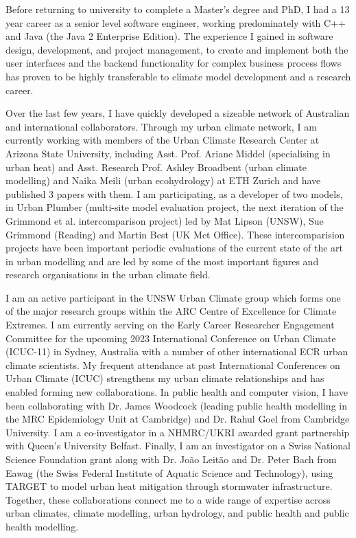 Before returning to university to complete a Master's degree and PhD, I had a 13 year career as a senior level software engineer, working predominately with C++ and Java (the Java 2 Enterprise Edition). The experience I gained in software design, development, and project management, to create and implement both the user interfaces and the backend functionality for complex business process flows has proven to be highly transferable to climate model development and a research career. 

Over the last few years, I have quickly developed a sizeable network of Australian and international collaborators. Through my urban climate network, I am currently working with members of the Urban Climate Research Center at Arizona State University, including Asst. Prof. Ariane Middel (specialising in urban heat) and Asst. Research Prof. Ashley Broadbent (urban climate modelling) and Naika Meili (urban ecohydrology) at ETH Zurich and have published 3 papers with them. I am participating, as a developer of two models, in Urban Plumber (multi-site model evaluation project, the next iteration of the Grimmond et al.\cite{Grimmond2011} intercomparison project) led by Mat Lipson (UNSW), Sue Grimmond (Reading) and Martin Best (UK Met Office). These intercomparision projects have been important periodic evaluations of the current state of the art in urban modelling and are led by some of the most important figures and research organisations in the urban climate field. 

I am an active participant in the UNSW Urban Climate group which forms one of the major research groups within the ARC Centre of Excellence for Climate Extremes. I am currently serving on the Early Career Researcher Engagement Committee for the upcoming 2023 International Conference on Urban Climate (ICUC-11) in Sydney, Australia with a number of other international ECR urban climate scientists. My frequent attendance at past International Conferences on Urban Climate (ICUC) strengthens my urban climate relationships and has enabled forming new collaborations. In public health and computer vision, I have been collaborating with Dr. James Woodcock (leading public health modelling in the MRC Epidemiology Unit at Cambridge) and Dr. Rahul Goel from Cambridge University. I am a co-investigator in a NHMRC/UKRI awarded grant partnership with Queen's University Belfast. Finally, I am an investigator on a Swiss National Science Foundation grant along with Dr. Jo\~{a}o Leit\~{a}o and Dr. Peter Bach from Eawag (the Swiss Federal Institute of Aquatic Science and Technology), using TARGET to model urban heat mitigation through stormwater infrastructure. Together, these collaborations connect me to a wide range of expertise across urban climates, climate modelling, urban hydrology, and public health and public health modelling.

